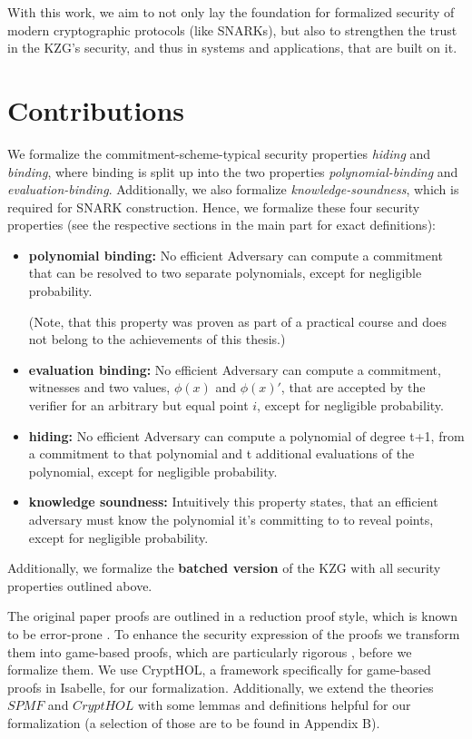 With this work, we aim to not only lay the foundation for formalized security of modern cryptographic protocols (like SNARKs), but also to strengthen the trust in the KZG's security, and thus in systems and applications, that are built on it. 

\section{Contributions}

We formalize the commitment-scheme-typical security properties \textit{hiding} and \textit{binding}, where binding is split up into the two properties \textit{polynomial-binding} and \textit{evaluation-binding}. Additionally, we also formalize \textit{knowledge-soundness}, which is required for SNARK construction. Hence, we formalize these four security properties (see the respective sections in the main part for exact definitions):
\begin{itemize}
    \item \textbf{polynomial binding:}
    No efficient Adversary can compute a commitment that can be resolved to two separate polynomials, except for negligible probability.

    (Note, that this property was proven as part of a practical course and does not belong to the achievements of this thesis.)
    \item \textbf{evaluation binding:}
    No efficient Adversary can compute a commitment, witnesses and two values, $\phi(x)$ and $\phi(x)'$, that are accepted by the verifier for an arbitrary but equal point $i$, except for negligible probability.
    \item \textbf{hiding:}
    No efficient Adversary can compute a polynomial of degree t+1, from a commitment to that polynomial and t additional evaluations of the polynomial, except for negligible probability.
    \item \textbf{knowledge soundness:}
    Intuitively this property states, that an efficient adversary must know the polynomial it's committing to to reveal points, except for negligible probability. 
\end{itemize} 
Additionally, we formalize the \textbf{batched version} of the KZG with all security properties outlined above.  

The original paper proofs are outlined in a reduction proof style, which is known to be error-prone \parencite{gamesB&R}. To enhance the security expression of the proofs we transform them into game-based proofs, which are particularly rigorous \parencite{shoup_games, gamesB&R}, before we formalize them. We use CryptHOL, a framework specifically for game-based proofs in Isabelle, for our formalization. 
Additionally, we extend the theories $SPMF$ and $CryptHOL$ with some lemmas and definitions helpful for our formalization (a selection of those are to be found in Appendix B).

